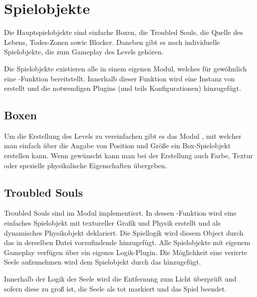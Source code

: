 \section{Spielobjekte}

Die Hauptspielobjekte sind einfache Boxen, die Troubled Souls, die Quelle des Lebens, Todes-Zonen sowie Blocker. Daneben gibt es noch individuelle Spielobjekte, die zum Gameplay des Levels gehören.

Die Spielobjekte existieren alle in einem eigenen Modul, welches für gewöhnlich eine -Funktion bereitstellt. Innerhalb dieser Funktion wird eine Instanz von  erstellt und die notwendigen Plugins (und teils Konfigurationen) hinzugefügt.

\subsection{Boxen}

Um die Erstellung des Levels zu vereinfachen gibt es das Modul , mit welcher man einfach über die Angabe von Position und Größe ein Box-Spielobjekt erstellen kann. Wenn gewünscht kann man bei der Erstellung auch Farbe, Textur oder spezielle physikalische Eigenschaften übergeben.

\subsection{Troubled Souls}

Troubled Souls sind im Modul  implementiert. In dessen -Funktion wird eine einfaches Spielobjekt mit textureller Grafik und Physik erstellt und als dynamisches Physikobjekt deklariert. Die Spiellogik wird diesem Object durch das in derselben Datei vorzufindende  hinzugefügt. Alle Spielobjekte mit eigenem Gameplay verfügen über ein eigenes Logik-Plugin. Die Möglichkeit eine verirrte Seele aufzunehmen wird dem Spielobjekt durch das  hinzugefügt.

Innerhalb der Logik der Seele wird die Entfernung zum Licht überprüft und sofern diese zu groß ist, die Seele als tot markiert und das Spiel beendet.

